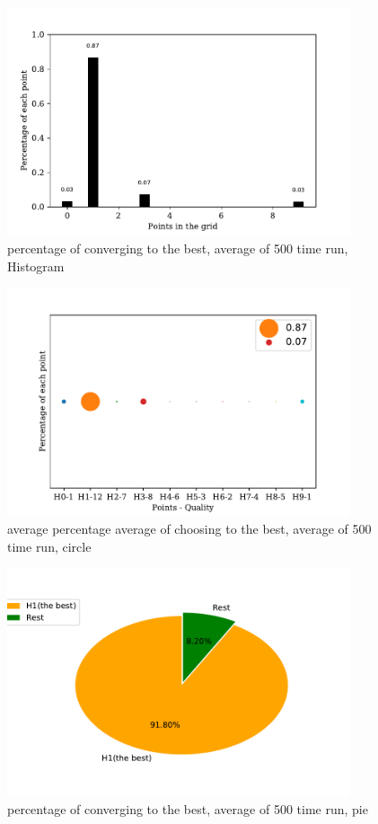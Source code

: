 \documentclass[a4paper,12pt]{article}
\begin{document}
	\begin{figure}[H]
		\centering
		\includegraphics[width=0.9\textwidth]{average_percentagenorm1_200_3000_500}
		\caption{percentage of converging to the best, average of 500 time run, Histogram}\label{average_percentagenorm1_200_3000_500}
	\end{figure}
	\begin{figure}[H]
		\centering
		\includegraphics[width=0.9\textwidth]{Average_percentagenorm1_200_3000_500_2}
		\caption{average percentage average of choosing to the best, average of 500 time run, circle}\label{Average_percentagenorm1_200_3000_500_2}
	\end{figure}
	\begin{figure}[H]
		\centering
		\includegraphics[width=0.9\textwidth]{average_percentagenorm1_200_3000_500_3}
		\caption{percentage of converging to the best, average of 500 time run, pie}\label{average_percentagenorm1_200_3000_500_3}
	\end{figure}
	
\end{document}
